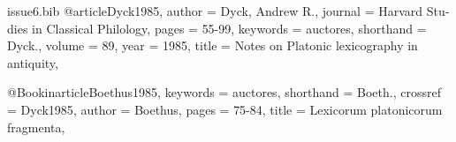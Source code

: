 

\begin{filecontents}{issue6.bib}
@article{Dyck1985,
  author = {Dyck, Andrew R.},
  journal =    {Harvard Studies in Classical Philology},
  pages =      {55-99},
   keywords = {auctores}, 
   shorthand = {Dyck.},
  volume =     {89},
  year =       {1985},
  title =  {Notes on Platonic lexicography in antiquity},
}

@Bookinarticle{Boethus1985,
  keywords = {auctores}, 
  shorthand = {Boeth.},
   crossref  = {Dyck1985},
  author =     {Boethus},
  pages =      {75-84},
  title =      {Lexicorum platonicorum fragmenta},
}
\end{filecontents}

\documentclass[11pt,a4paper]{book}
\usepackage{fontspec}
    \setmainfont{Linux Libertine O}

\usepackage{polyglossia}
    \setmainlanguage[babelshorthands=true]{italian}

\usepackage[%
    style=philosophy-classic,%
    backend=biber,%
    dashed=true,%
    url = false,%
    isbn = false,%
    firstinits=true,%
    uniquename=init,%
    ]{biblatex}
\usepackage{biblatex-bookinarticle}



\nocite{*}
\printbibliography

\newpage
\nocite{*}


